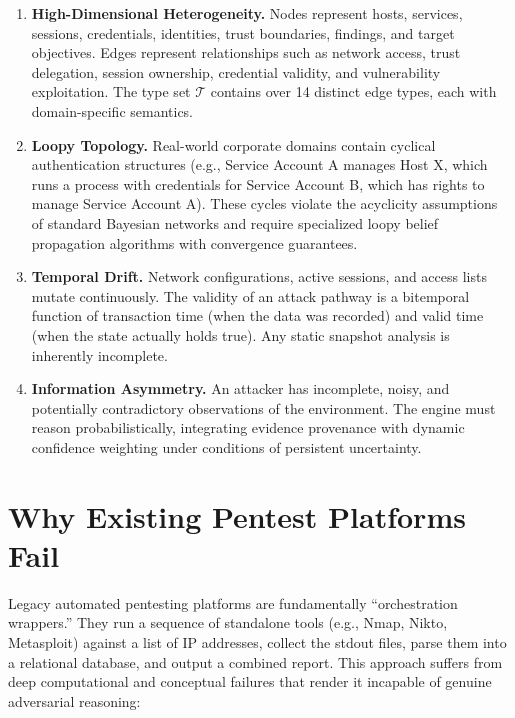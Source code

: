 \documentclass[11pt,a4paper]{article}
\theoremstyle{definition}
\numberwithin{equation}{section}
\begin{document}
\begin{enumerate}[label=\textbf{\arabic*.}, leftmargin=2em]
    \item \textbf{High-Dimensional Heterogeneity.} Nodes represent hosts, services, sessions, credentials, identities, trust boundaries, findings, and target objectives. Edges represent relationships such as network access, trust delegation, session ownership, credential validity, and vulnerability exploitation. The type set $\mathcal{T}$ contains over 14 distinct edge types, each with domain-specific semantics.

    \item \textbf{Loopy Topology.} Real-world corporate domains contain cyclical authentication structures (e.g., Service Account A manages Host X, which runs a process with credentials for Service Account B, which has rights to manage Service Account A). These cycles violate the acyclicity assumptions of standard Bayesian networks and require specialized loopy belief propagation algorithms with convergence guarantees.

    \item \textbf{Temporal Drift.} Network configurations, active sessions, and access lists mutate continuously. The validity of an attack pathway is a bitemporal function of transaction time (when the data was recorded) and valid time (when the state actually holds true). Any static snapshot analysis is inherently incomplete.

    \item \textbf{Information Asymmetry.} An attacker has incomplete, noisy, and potentially contradictory observations of the environment. The engine must reason probabilistically, integrating evidence provenance with dynamic confidence weighting under conditions of persistent uncertainty.
\end{enumerate}

\section{Why Existing Pentest Platforms Fail}\label{sec:legacy}

Legacy automated pentesting platforms are fundamentally ``orchestration wrappers.'' They run a sequence of standalone tools (e.g., Nmap, Nikto, Metasploit) against a list of IP addresses, collect the stdout files, parse them into a relational database, and output a combined report. This approach suffers from deep computational and conceptual failures that render it incapable of genuine adversarial reasoning:
\end{document}
